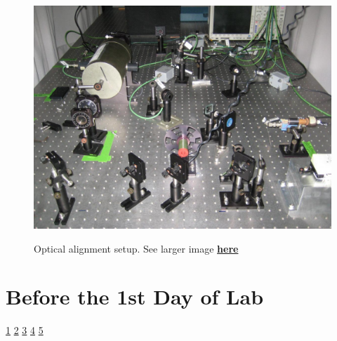 \documentclass{../lab}
\begin{document}
\begin{figure}[H]
\begin{minipage}[t]{0.26\textwidth}
    \href{http://experimentationlab.berkeley.edu/sites/default/files/IMG\_4083.JPG}{\includegraphics[width=\linewidth,keepaspectratio]{images/IMG_4083.JPG}}
    \caption{Optical alignment setup. See larger image \href{http://experimentationlab.berkeley.edu/sites/default/files/IMG\_4083.JPG}{\textbf{here}}}
\end{minipage}
\end{figure}

\newpage

\section{Before the 1st Day of Lab}
\label{sec:BeforeFirstDay}

\signatures \hyperlink{Optical Setup}{1} \hyperlink{Laser Beam Shape and Size}{2} \hyperlink{Frequency Range Scan}{3} \hyperlink{Vapor Cell}{4} \hyperlink{Earth's Magnetic Field}{5} 
\end{document}
